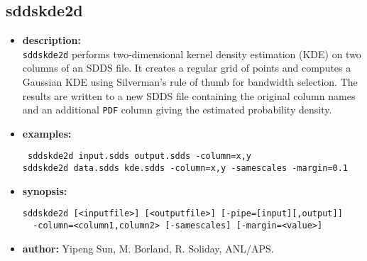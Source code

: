 \newpage
\subsection{sddskde2d}
\label{sddskde2d}

\begin{itemize}
\item {\bf description:} \hspace*{1mm}\\
{\tt sddskde2d} performs two-dimensional kernel density estimation (KDE) on two columns of an SDDS file. It creates a regular grid of points and computes a Gaussian KDE using Silverman's rule of thumb for bandwidth selection. The results are written to a new SDDS file containing the original column names and an additional {\tt PDF} column giving the estimated probability density.
\item {\bf examples:}
\begin{flushleft}{\tt
   sddskde2d input.sdds output.sdds -column=x,y\\
   sddskde2d data.sdds kde.sdds -column=x,y -samescales -margin=0.1
}\end{flushleft}
\item {\bf synopsis:}
\begin{flushleft}
\begin{verbatim}
sddskde2d [<inputfile>] [<outputfile>] [-pipe=[input][,output]]
  -column=<column1,column2> [-samescales] [-margin=<value>]
\end{verbatim}
\end{flushleft}
\item {\bf author:} Yipeng Sun, M. Borland, R. Soliday, ANL/APS.
\end{itemize}
